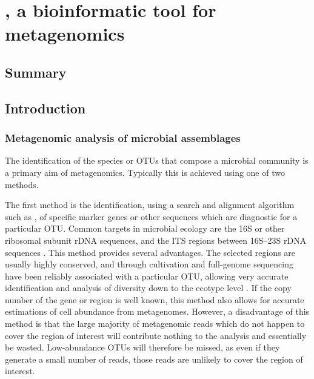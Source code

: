 \chapter[\softwarename{minspec}]{, a bioinformatic tool for metagenomics}
\label{ch:minspec}


\section{Summary}

\section{Introduction}

\subsection{Metagenomic analysis of microbial assemblages}

The identification of the species or \acp{OTU} that compose a microbial community is a primary aim of metagenomics.
Typically this is achieved using one of two methods.

The first method is the identification, using a search and alignment algorithm such as , of specific marker genes or other sequences which are diagnostic for a particular \ac{OTU}.
Common targets in microbial ecology are the 16S or other ribosomal subunit rDNA sequences, and the \ac{ITS} regions between 16S--23S rDNA sequences \citep[e.g.][]{Brown:2012gna}.
This method provides several advantages.
The selected regions are usually highly conserved, and through cultivation and full-genome sequencing have been reliably associated with a particular \ac{OTU}, allowing very accurate identification and analysis of diversity down to the ecotype level \citep[e.g.][]{Brown:2012gna}.
If the copy number of the gene or region is well known, this method also allows for accurate estimations of cell abundance from metagenomes.
However, a disadvantage of this method is that the large majority of metagenomic reads which do not happen to cover the region of interest will contribute nothing to the analysis and essentially be wasted.
Low-abundance \acp{OTU} will therefore be missed, as even if they generate a small number of reads, those reads are unlikely to cover the region of interest.

